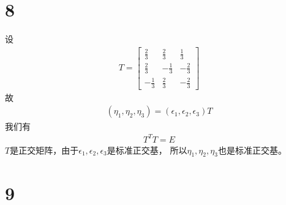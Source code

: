 \documentclass{article}
\begin{document}
\section*{8}
设
\begin{align*}
  T = \begin{bmatrix}
        \frac{2}{3}   & \frac{2}{3}   & \frac{1}{3}   \\
        \frac{2}{3}   & - \frac{1}{3} & - \frac{2}{3} \\
        - \frac{1}{3} & \frac{2}{3}   & - \frac{2}{3}
      \end{bmatrix}
\end{align*}
故
\begin{align*}
  (\eta_1, \eta_2, \eta_3) = (\epsilon_1, \epsilon_2, \epsilon_3) T
\end{align*}
我们有
\begin{align*}
  T^T T = E
\end{align*}
$T$是正交矩阵，由于$\epsilon_1, \epsilon_2, \epsilon_3$是标准正交基，
所以$\eta_1, \eta_2, \eta_3$也是标准正交基。

\section*{9}
\end{document}
